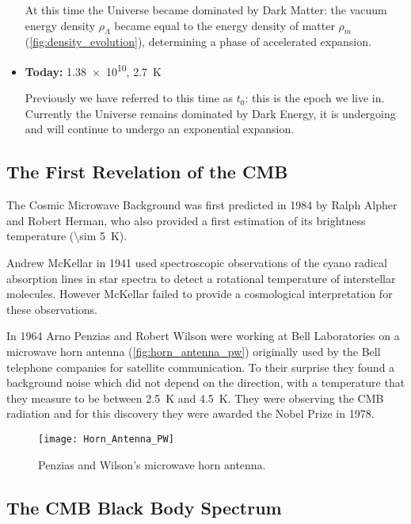\begin{itemize}
        At this time the Universe became dominated by Dark Matter: the
        vacuum energy density $\rho_\Lambda$ became equal to the energy density of
        matter $\rho_m$ (\autoref{fig:density_evolution}), determining a
        phase of accelerated expansion.

        \item \textbf{Today:} \SI{1.38e10}{\year}, \SI{2.7}{\kelvin}

        Previously we have referred to this time as $t_0$: this is
        the epoch we live in. Currently the Universe remains dominated by
        Dark Energy, it is undergoing and will continue to undergo an exponential
        expansion.
\end{itemize}

\subsection{The First Revelation of the CMB}

The Cosmic Microwave Background was first predicted in 1984 by Ralph Alpher
and Robert Herman, who also provided a first estimation of its brightness
temperature (\SI{\sim 5}{\kelvin}).

Andrew McKellar in 1941 used spectroscopic observations of the cyano radical
absorption lines in star spectra to detect a rotational temperature of
interstellar molecules. However McKellar failed to provide a cosmological
interpretation for these observations.

In 1964 Arno Penzias and Robert Wilson were working at Bell Laboratories
on a microwave horn antenna (\autoref{fig:horn_antenna_pw}) originally used by
the Bell telephone companies for satellite communication.
To their surprise they found a background noise which did not depend on the
direction, with a temperature that they measure to be between
\SI{2.5}{\kelvin} and \SI{4.5}{\kelvin}. They were observing the CMB
radiation and for this discovery they were awarded the Nobel Prize in 1978.

\begin{figure}
        \centering
        \texttt{[image: Horn\_Antenna\_PW]}
        \caption{Penzias and Wilson's microwave horn antenna.}
        \label{fig:horn_antenna_pw}
\end{figure}

\subsection{The CMB Black Body Spectrum}\label{ss:cmb_bb}

